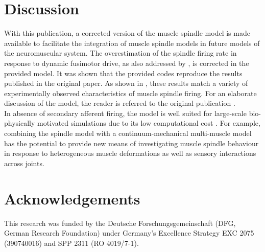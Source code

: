 \documentclass[fleqn,10pt]{physiome}
\begin{document}
\section{Discussion}
With this publication, a corrected version of the \citet{maltenfort2003} muscle spindle model is made available to facilitate the integration of muscle spindle models in future models of the neuromuscular system. 
The overestimation of the spindle firing rate in response to dynamic fusimotor drive, as also addressed by \citet{grandjean2014}, is corrected in the provided model. 
It was shown that the provided codes reproduce the results published in the original paper. 
As shown in \citet{maltenfort2003}, these results match a variety of experimentally observed characteristics of muscle spindle firing. 
For an elaborate discussion of the model, the reader is referred to the original publication \citep{maltenfort2003}. \\
In absence of secondary afferent firing, the model is well suited for large-scale bio-physically motivated simulations due to its low computational cost \citep[cf. e.\,g.][]{rohrle2019}.
For example, combining the spindle model with a continuum-mechanical multi-muscle model \citep[e.g.][]{roehrle2017} has the potential to provide new means of investigating muscle spindle behaviour in response to heterogeneous muscle deformations as well as sensory interactions across joints.


\FloatBarrier

\section*{Acknowledgements}
This research was funded by the Deutsche Forschungsgemeinschaft (DFG, German Research Foundation) under Germany’s Excellence Strategy EXC 2075 (390740016) and SPP 2311 (RO 4019/7-1).


\end{document}
